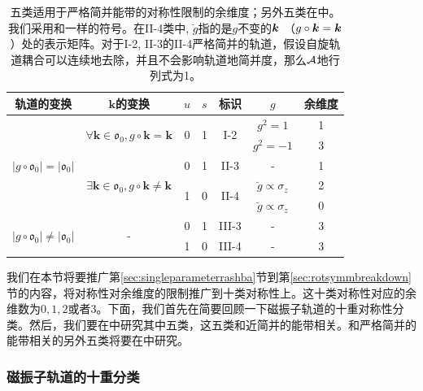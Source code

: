 \begin{table}
	\begin{tabular}{|c|c|c|c|c|c|c|}
	\hline 
	轨道的变换 & $\boldsymbol{k}$的变换  & $u$ & $s$  & 标识 & $g$  & 余维度\tabularnewline
	\hline 
	\multirow{5}{*}{$|g\circ\mathfrak{o}_{0}|=|\mathfrak{o}_{0}|$} & \multirow{2}{*}{$\forall\boldsymbol{k}\in\mathfrak{o}_{0},g\circ\boldsymbol{k}=\boldsymbol{k}$} & \multirow{2}{*}{0} & \multirow{2}{*}{1} & \multirow{2}{*}{I-2} & $g^{2}=1$  & 1\tabularnewline
	\cline{6-7} 
	 &  &  &  &  & $g^{2}=-1$  & 3\tabularnewline
	\cline{2-7} 
	 & \multirow{3}{*}{$\exists\boldsymbol{k}\in\mathfrak{o}_{0},g\circ\boldsymbol{k}\neq\boldsymbol{k}$} & 0 & 1 & II-3 & - & 1\tabularnewline
	\cline{3-7} 
	 &  & \multirow{2}{*}{1} & \multirow{2}{*}{0} & \multirow{2}{*}{II-4} & $\breve{g}\propto\sigma_{z}$  & 2\tabularnewline
	\cline{6-7} 
	 &  &  &  &  & $\breve{g}\propto\sigma_{z}$  & 0\tabularnewline
	\hline 
	\multirow{2}{*}{$|g\circ\mathfrak{o}_{0}|\neq|\mathfrak{o}_{0}|$ } & \multirow{2}{*}{-} & 0 & 1 & III-3 & - & 3\tabularnewline
	\cline{3-7} 
	 &  & 1 & 0 & III-4 & - & 3\tabularnewline
	\hline 
	\end{tabular}
	\centering
	\caption{五类适用于严格简并能带的对称性限制的余维度；另外五类在中。我们采用和一样的符号。在II-4类中, $\breve g$指的是$g$不变的$\boldsymbol{k}$ （$g\circ\boldsymbol{k}=\boldsymbol{k}$）处的表示矩阵。对于I-2, II-3的II-4严格简并的轨道，假设自旋轨道耦合可以连续地去除，并且不会影响轨道地简并度，那么${\cal A}$地行列式为1\cite{topoferm}。\label{table:codimension-exactlydegen}}
\end{table}

我们在本节将要推广第\ref{sec:singleparameterrashba}节到第\ref{sec:rotsymmbreakdown}节的内容，将对称性对余维度的限制推广到十类对称性上\cite{topoferm}。这十类对称性对应的余维数为$0,1,2$或者$3$。下面，我们首先在简要回顾一下磁振子轨道的十重对称性分类。然后，我们要在中研究其中五类，这五类和近简并的能带相关。和严格简并的能带相关的另外五类将要在中研究。

\subsubsection{磁振子轨道的十重分类}\label{sec:reviewtenfold}

